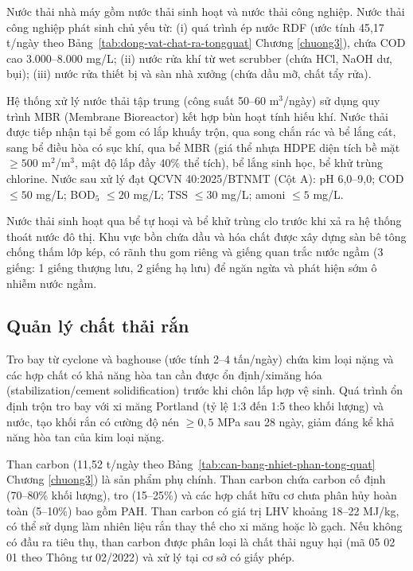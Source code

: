 \documentclass[../main.tex]{subfiles}
\begin{document}
Nước thải nhà máy gồm nước thải sinh hoạt và nước thải công nghiệp. Nước thải công nghiệp phát sinh chủ yếu từ: (i) quá trình ép nước RDF (ước tính 45,17 t/ngày theo Bảng~\ref{tab:dong-vat-chat-ra-tongquat} Chương \ref{chuong3}), chứa COD cao 3.000--8.000 mg/L; (ii) nước rửa khí từ wet scrubber (chứa HCl, NaOH dư, bụi); (iii) nước rửa thiết bị và sàn nhà xưởng (chứa dầu mỡ, chất tẩy rửa).

Hệ thống xử lý nước thải tập trung (công suất 50--60 m$^3$/ngày) sử dụng quy trình MBR (Membrane Bioreactor) kết hợp bùn hoạt tính hiếu khí. Nước thải được tiếp nhận tại bể gom có lắp khuấy trộn, qua song chắn rác và bể lắng cát, sang bể điều hòa có sục khí, qua bể MBR (giá thể nhựa HDPE diện tích bề mặt $\geq 500$ m$^2$/m$^3$, mật độ lấp đầy 40\% thể tích), bể lắng sinh học, bể khử trùng chlorine. Nước sau xử lý đạt QCVN 40:2025/BTNMT (Cột A): pH 6,0--9,0; COD $\leq 50$ mg/L; BOD$_5$ $\leq 20$ mg/L; TSS $\leq 30$ mg/L; amoni $\leq 5$ mg/L.

Nước thải sinh hoạt qua bể tự hoại và bể khử trùng clo trước khi xả ra hệ thống thoát nước đô thị. Khu vực bồn chứa dầu và hóa chất được xây dựng sàn bê tông chống thấm lớp kép, có rãnh thu gom riêng và giếng quan trắc nước ngầm (3 giếng: 1 giếng thượng lưu, 2 giếng hạ lưu) để ngăn ngừa và phát hiện sớm ô nhiễm nước ngầm.

\subsection{Quản lý chất thải rắn}

Tro bay từ cyclone và baghouse (ước tính 2--4 tấn/ngày) chứa kim loại nặng và các hợp chất có khả năng hòa tan cần được ổn định/ximăng hóa (stabilization/cement solidification) trước khi chôn lấp hợp vệ sinh. Quá trình ổn định trộn tro bay với xi măng Portland (tỷ lệ 1:3 đến 1:5 theo khối lượng) và nước, tạo khối rắn có cường độ nén $\geq 0{,}5$ MPa sau 28 ngày, giảm đáng kể khả năng hòa tan của kim loại nặng.

Than carbon (11,52 t/ngày theo Bảng~\ref{tab:can-bang-nhiet-phan-tong-quat} Chương \ref{chuong3}) là sản phẩm phụ chính. Than carbon chứa carbon cố định (70--80\% khối lượng), tro (15--25\%) và các hợp chất hữu cơ chưa phân hủy hoàn toàn (5--10\%) bao gồm PAH. Than carbon có giá trị LHV khoảng 18--22 MJ/kg, có thể sử dụng làm nhiên liệu rắn thay thế cho xi măng hoặc lò gạch. Nếu không có đầu ra tiêu thụ, than carbon được phân loại là chất thải nguy hại (mã 05 02 01 theo Thông tư 02/2022) và xử lý tại cơ sở có giấy phép.
\end{document}
